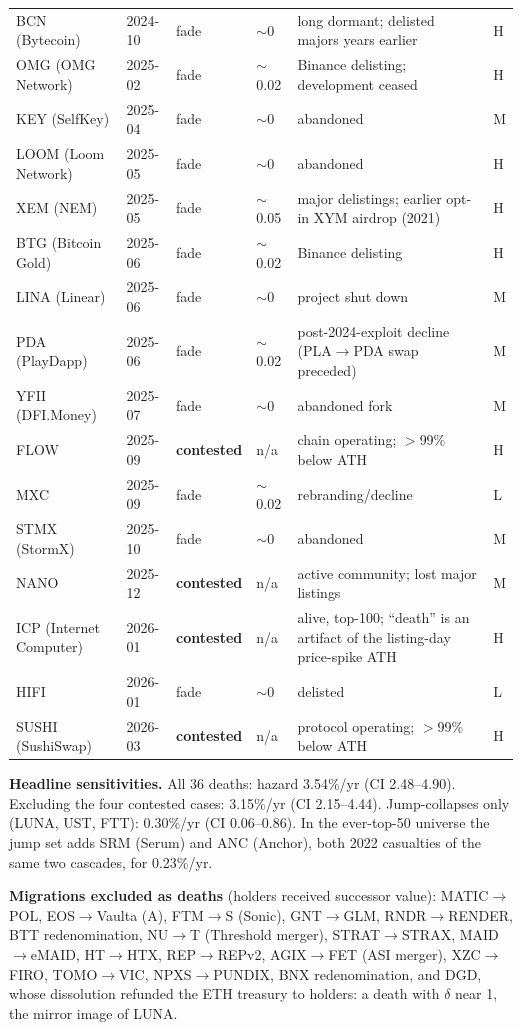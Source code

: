 \documentclass[11pt]{article}
\begin{document}
\begin{center}
\begin{longtable}{llllp{5.4cm}l}
BCN (Bytecoin) & 2024-10 & fade & $\sim$0 & long dormant; delisted majors years earlier & H \\
OMG (OMG Network) & 2025-02 & fade & $\sim$0.02 & Binance delisting; development ceased & H \\
KEY (SelfKey) & 2025-04 & fade & $\sim$0 & abandoned & M \\
LOOM (Loom Network) & 2025-05 & fade & $\sim$0 & abandoned & H \\
XEM (NEM) & 2025-05 & fade & $\sim$0.05 & major delistings; earlier opt-in XYM airdrop (2021) & H \\
BTG (Bitcoin Gold) & 2025-06 & fade & $\sim$0.02 & Binance delisting & H \\
LINA (Linear) & 2025-06 & fade & $\sim$0 & project shut down & M \\
PDA (PlayDapp) & 2025-06 & fade & $\sim$0.02 & post-2024-exploit decline (PLA$\to$PDA swap preceded) & M \\
YFII (DFI.Money) & 2025-07 & fade & $\sim$0 & abandoned fork & M \\
FLOW & 2025-09 & \textbf{contested} & n/a & chain operating; $>$99\% below ATH & H \\
MXC & 2025-09 & fade & $\sim$0.02 & rebranding/decline & L \\
STMX (StormX) & 2025-10 & fade & $\sim$0 & abandoned & M \\
NANO & 2025-12 & \textbf{contested} & n/a & active community; lost major listings & M \\
ICP (Internet Computer) & 2026-01 & \textbf{contested} & n/a & alive, top-100; ``death'' is an artifact of the listing-day price-spike ATH & H \\
HIFI & 2026-01 & fade & $\sim$0 & delisted & L \\
SUSHI (SushiSwap) & 2026-03 & \textbf{contested} & n/a & protocol operating; $>$99\% below ATH & H \\
\bottomrule
\end{longtable}
\end{center}

\textbf{Headline sensitivities.} All 36 deaths: hazard 3.54\%/yr (CI 2.48--4.90). Excluding the four contested cases: 3.15\%/yr (CI 2.15--4.44). Jump-collapses only (LUNA, UST, FTT): 0.30\%/yr (CI 0.06--0.86). In the ever-top-50 universe the jump set adds SRM (Serum) and ANC (Anchor), both 2022 casualties of the same two cascades, for 0.23\%/yr.

\textbf{Migrations excluded as deaths} (holders received successor value): MATIC$\to$POL, EOS$\to$Vaulta (A), FTM$\to$S (Sonic), GNT$\to$GLM, RNDR$\to$RENDER, BTT redenomination, NU$\to$T (Threshold merger), STRAT$\to$STRAX, MAID$\to$eMAID, HT$\to$HTX, REP$\to$REPv2, AGIX$\to$FET (ASI merger), XZC$\to$FIRO, TOMO$\to$VIC, NPXS$\to$PUNDIX, BNX redenomination, and DGD, whose dissolution refunded the ETH treasury to holders: a death with $\delta$ near 1, the mirror image of LUNA.
\end{document}
